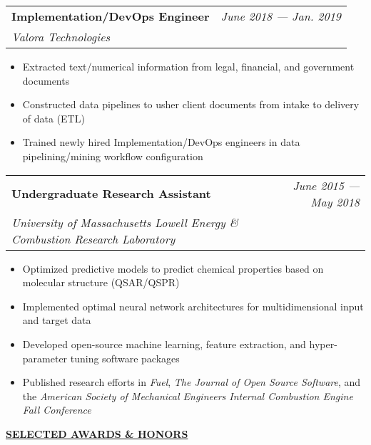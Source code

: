 \documentclass{letter}
\begin{document}
    \begin{tabular*}{\linewidth}{L r}
        \textbf{Implementation/DevOps Engineer} & \textit{June 2018 --- Jan. 2019} \\
        \textit{Valora Technologies} & 
    \end{tabular*}

    \small
    \begin{itemize}[leftmargin=0.75cm]
        \setlength{\itemsep}{0pt}
        \item Extracted text/numerical information from legal, financial, and government documents
        \item Constructed data pipelines to usher client documents from intake to delivery of data (ETL)
        \item Trained newly hired Implementation/DevOps engineers in data pipelining/mining workflow configuration
    \end{itemize}
    \normalsize

    \newpage

    \begin{tabular*}{\linewidth}{L r}
        \textbf{Undergraduate Research Assistant} & \textit{June 2015 --- May 2018} \\
        \textit{University of Massachusetts Lowell Energy \& Combustion Research Laboratory} & 
    \end{tabular*}

    \small
    \begin{itemize}[leftmargin=0.75cm]
        \setlength{\itemsep}{0pt}
        \item Optimized predictive models to predict chemical properties based on molecular structure (QSAR/QSPR)
        \item Implemented optimal neural network architectures for multidimensional input and target data
        \item Developed open-source machine learning, feature extraction, and hyper-parameter tuning software packages
        \item Published research efforts in \textit{Fuel}, \textit{The Journal of Open Source Software}, and the \textit{American Society of Mechanical Engineers Internal Combustion Engine Fall Conference}
    \end{itemize}
    \normalsize

    \medskip \large \textbf{\underline{SELECTED AWARDS \& HONORS}} \medskip \small
\end{document}
